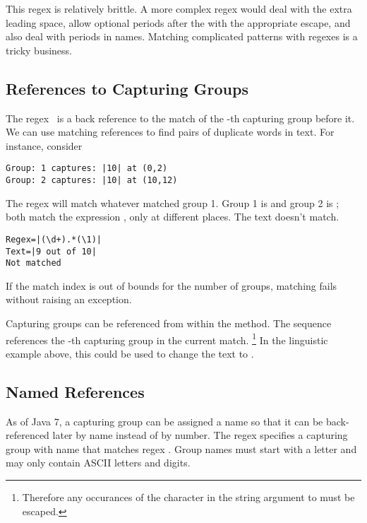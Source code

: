 This regex is relatively brittle.
A more complex regex would deal with the extra leading space, 
allow optional periods after the  with the
appropriate escape, and also deal with periods in names.
Matching complicated patterns with regexes is a tricky business.

\subsection{References to Capturing Groups}\label{section:regex-back-references}

The regex \, is a back reference to the match of
the -th capturing group before it.  We can use matching
references to find pairs of duplicate words in text.  For instance,
consider
%
\begin{verbatim}
Group: 1 captures: |10| at (0,2)
Group: 2 captures: |10| at (10,12)
\end{verbatim}
% 
The regex  will match whatever matched group 1.  
Group 1 is  and group 2 is ; both
match the expression , only at different places.
The text  doesn't match.
%
\begin{verbatim} 
Regex=|(\d+).*(\1)|
Text=|9 out of 10|
Not matched
\end{verbatim}
%
If the match index is out of bounds for the number of groups, matching
fails without raising an exception.

Capturing groups can be referenced from within the 
method.
The sequence  references the -th capturing group
in the current match.%
%
\footnote{Therefore any occurances of the character \stringmention{\$}
in the string argument to  must be escaped.}
%
%
In the linguistic example above, this could be used to change the text
 to .

\subsection{Named References}\label{section:regex-named-references}

As of Java 7,
a capturing group can be assigned a name
so that it can be back-referenced later by name instead of by number.
The regex  specifies a capturing group with name 
that matches regex .
Group names must start with a letter and may only contain ASCII letters and digits.

